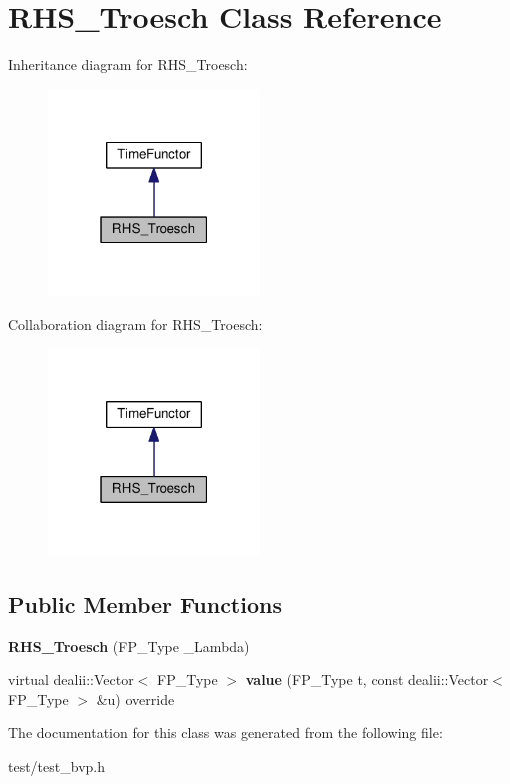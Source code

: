 \hypertarget{classRHS__Troesch}{}\section{R\+H\+S\+\_\+\+Troesch Class Reference}
\label{classRHS__Troesch}


Inheritance diagram for R\+H\+S\+\_\+\+Troesch\+:\nopagebreak
\begin{figure}[H]
\begin{center}
\leavevmode
\includegraphics[width=159pt]{classRHS__Troesch__inherit__graph}
\end{center}
\end{figure}


Collaboration diagram for R\+H\+S\+\_\+\+Troesch\+:\nopagebreak
\begin{figure}[H]
\begin{center}
\leavevmode
\includegraphics[width=159pt]{classRHS__Troesch__coll__graph}
\end{center}
\end{figure}
\subsection*{Public Member Functions}
\begin{DoxyCompactItemize}
\item 
\mbox{\label{classRHS__Troesch_a9b1470fa97701e5ad4c5acdead8169ac}} 
{\bfseries R\+H\+S\+\_\+\+Troesch} (F\+P\+\_\+\+Type \+\_\+\+Lambda)
\item 
\mbox{\label{classRHS__Troesch_ab8d9151e9d6801c397123f29777fa4d1}} 
virtual dealii\+::\+Vector$<$ F\+P\+\_\+\+Type $>$ {\bfseries value} (F\+P\+\_\+\+Type t, const dealii\+::\+Vector$<$ F\+P\+\_\+\+Type $>$ \&u) override
\end{DoxyCompactItemize}


The documentation for this class was generated from the following file\+:\begin{DoxyCompactItemize}
\item 
test/test\+\_\+bvp.\+h\end{DoxyCompactItemize}
